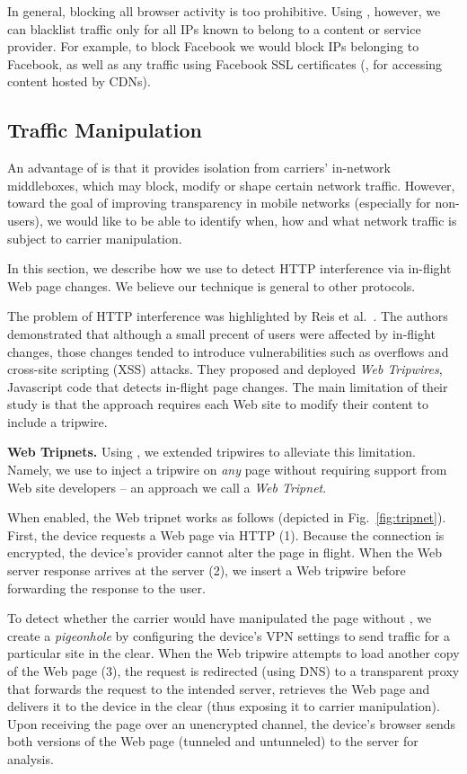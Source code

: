 In general, blocking all browser activity is too prohibitive. Using \meddle, however, we can blacklist traffic only for 
all IPs known to belong to a content or service provider. For example, to block 
Facebook we would block IPs belonging to Facebook, as well as any traffic using Facebook 
SSL certificates (\eg, for accessing content hosted by CDNs). 

\subsection{Traffic Manipulation}
An advantage of \meddle is that it provides isolation from carriers' in-network 
middleboxes, which may block, modify or shape certain network traffic. However, 
toward the goal of improving transparency in mobile networks (especially for 
non-\meddle users), we would like to be able to identify when, how and what 
network traffic is subject to carrier manipulation. 

In this section, we describe how we use \meddle to detect HTTP interference via 
in-flight Web page changes. We believe our technique 
is general to other protocols. 

The problem of HTTP interference was highlighted 
by Reis et al.~\cite{reis:tripwires}. The authors demonstrated that although a small 
precent of users were affected by in-flight changes, those changes tended to introduce 
vulnerabilities such as overflows and cross-site scripting (XSS) attacks. They proposed and deployed 
\emph{Web Tripwires}, Javascript code that detects in-flight page changes. The main 
limitation of their study is that the approach requires each Web site to modify their content to 
include a tripwire.

\noindent\textbf{Web Tripnets.} Using \meddle, we extended tripwires to alleviate this 
limitation. Namely, we use \meddle to inject a tripwire on \emph{any} page without requiring 
support from Web site developers -- an approach we call a \emph{Web Tripnet}.

When enabled, the Web tripnet works as follows (depicted in Fig.~\ref{fig:tripnet}). First, the device requests a Web page via 
HTTP (1). Because the \meddle connection is encrypted, the device's 
provider cannot alter the page in flight. When the Web server response arrives at 
the \meddle server (2), we insert a Web tripwire before forwarding the response to the user. 

To detect whether the carrier would have manipulated the 
page without \meddle, we create a \emph{pigeonhole} by configuring the device's VPN settings to send 
traffic for a particular site in the clear. When the Web tripwire attempts to load another copy 
of the Web page (3), the request is redirected (using DNS) to a transparent proxy that forwards the request to the intended server, 
retrieves the Web page and delivers it to the device in the clear (thus exposing it to carrier manipulation). 
Upon receiving the page over an unencrypted channel, the device's browser sends both 
versions of the Web page (tunneled and untunneled) to the \meddle server for analysis. 

